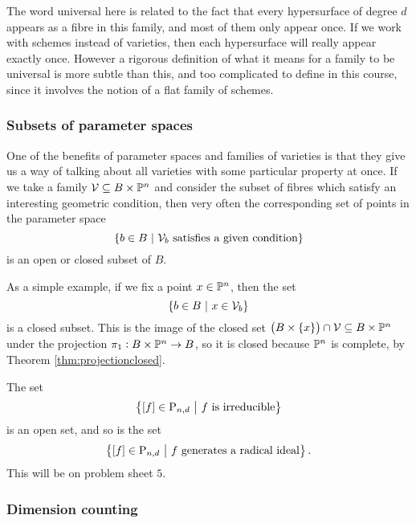 \begin{remark*}
The word universal here is related to the fact that every hypersurface of degree $ d $ appears as a fibre in this family, and most of them only appear once. If we work with schemes instead of varieties, then each hypersurface will really appear exactly once. However a rigorous definition of what it means for a family to be universal is more subtle than this, and too complicated to define in this course, since it involves the notion of a flat family of schemes.
\end{remark*}

\pagebreak

\subsubsection{Subsets of parameter spaces}

One of the benefits of parameter spaces and families of varieties is that they give us a way of talking about all varieties with some particular property at once. If we take a family $ \mathcal{V} \subseteq B \times \mathbb{P}^n $ and consider the subset of fibres which satisfy an interesting geometric condition, then very often the corresponding set of points in the parameter space
$$ \cbr{b \in B \st \VVV_b \ \text{satisfies a given condition}} $$
is an open or closed subset of $ B $.

\begin{example*}
As a simple example, if we fix a point $ x \in \mathbb{P}^n $, then the set
$$ \cbr{b \in B \st x \in \VVV_b} $$
is a closed subset. This is the image of the closed set $ \br{B \times \cbr{x}} \cap \VVV \subseteq B \times \PP^n $ under the projection $ \pi_1 : B \times \mathbb{P}^n \to B $, so it is closed because $ \mathbb{P}^n $ is complete, by Theorem \ref{thm:projectionclosed}.
\end{example*}

\begin{example*}
The set
$$ \cbr{\sbr{f} \in \P_{n, d} \st f \ \text{is irreducible}} $$
is an open set, and so is the set
$$ \cbr{\sbr{f} \in \P_{n, d} \st f \ \text{generates a radical ideal}}. $$
This will be on problem sheet $ 5 $.
\end{example*}

\subsubsection{Dimension counting}


